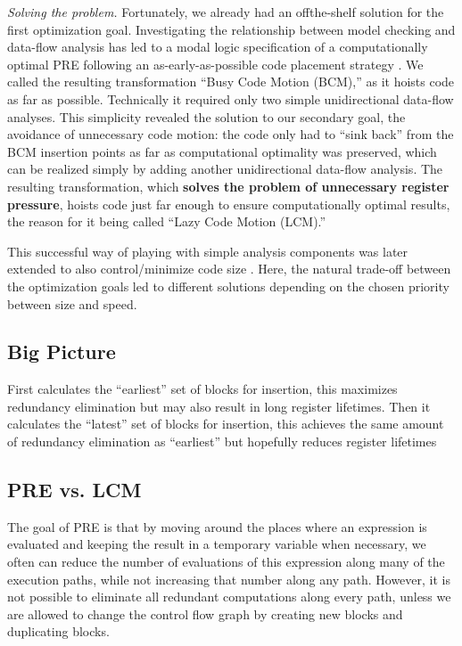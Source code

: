 \textit{Solving the problem.} Fortunately, we already had an offthe-shelf solution for the first optimization goal. Investigating the relationship between model checking and data-flow
analysis has led to a modal logic specification of a computationally optimal PRE following an as-early-as-possible code
placement strategy \cite{steffen1991data}. We called the resulting transformation “Busy Code Motion (BCM),” as it hoists code as
far as possible. Technically it required only two simple unidirectional data-flow analyses. This simplicity revealed the
solution to our secondary goal, the avoidance of unnecessary code motion: the code only had to “sink back” from
the BCM insertion points as far as computational optimality was preserved, which can be realized simply by adding another 
unidirectional data-flow analysis. The resulting transformation, which \textbf{solves the problem of unnecessary register
pressure}, hoists code just far enough to ensure computationally optimal results, the reason for it being called “Lazy
Code Motion (LCM).”

This successful way of playing with simple analysis components was later extended to also control/minimize code
size \cite{ruthing2000sparse}. Here, the natural trade-off between the optimization goals led to different solutions depending on the chosen
priority between size and speed.


\subsection{Big Picture}

First calculates the “earliest” set of blocks for insertion, this maximizes redundancy elimination but may also result in long register lifetimes.
Then it calculates the “latest” set of blocks for insertion, this achieves the same amount of redundancy elimination as “earliest” but hopefully reduces register lifetimes


\subsection{PRE vs. LCM}


The goal of PRE is that by {\color{red}moving around} the places where an expression is
evaluated and keeping the result in a temporary variable when
necessary, we often can {\color{red}reduce the number of evaluations} of this
expression along many of the execution paths, {\color{red}while not
increasing that number along any path.} However, it is {\color{red}not} possible to eliminate all redundant computations along
every path, unless we are allowed to {\color{red}change the control flow
graph} by {\color{red}creating new blocks} and {\color{red}duplicating blocks.}

